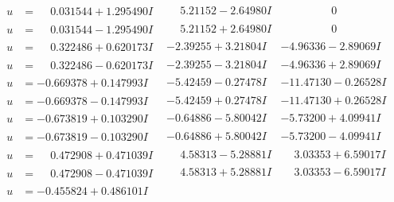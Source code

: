 \documentclass[1p]{elsarticle_modified}
\theoremstyle{definition}
\begin{document}
$$\begin{array}{c|c|c}
 \hline 
\begin{aligned}
u &= \phantom{-}0.031544 + 1.295490 I\end{aligned}
 & \phantom{-}5.21152 - 2.64980 I & \phantom{-0.000000 } 0 \\ \hline\begin{aligned}
u &= \phantom{-}0.031544 - 1.295490 I\end{aligned}
 & \phantom{-}5.21152 + 2.64980 I & \phantom{-0.000000 } 0 \\ \hline\begin{aligned}
u &= \phantom{-}0.322486 + 0.620173 I\end{aligned}
 & -2.39255 + 3.21804 I & -4.96336 - 2.89069 I \\ \hline\begin{aligned}
u &= \phantom{-}0.322486 - 0.620173 I\end{aligned}
 & -2.39255 - 3.21804 I & -4.96336 + 2.89069 I \\ \hline\begin{aligned}
u &= -0.669378 + 0.147993 I\end{aligned}
 & -5.42459 - 0.27478 I & -11.47130 - 0.26528 I \\ \hline\begin{aligned}
u &= -0.669378 - 0.147993 I\end{aligned}
 & -5.42459 + 0.27478 I & -11.47130 + 0.26528 I \\ \hline\begin{aligned}
u &= -0.673819 + 0.103290 I\end{aligned}
 & -0.64886 - 5.80042 I & -5.73200 + 4.09941 I \\ \hline\begin{aligned}
u &= -0.673819 - 0.103290 I\end{aligned}
 & -0.64886 + 5.80042 I & -5.73200 - 4.09941 I \\ \hline\begin{aligned}
u &= \phantom{-}0.472908 + 0.471039 I\end{aligned}
 & \phantom{-}4.58313 - 5.28881 I & \phantom{-}3.03353 + 6.59017 I \\ \hline\begin{aligned}
u &= \phantom{-}0.472908 - 0.471039 I\end{aligned}
 & \phantom{-}4.58313 + 5.28881 I & \phantom{-}3.03353 - 6.59017 I \\ \hline\begin{aligned}
u &= -0.455824 + 0.486101 I\end{aligned}

\end{array}$$
\end{document}

